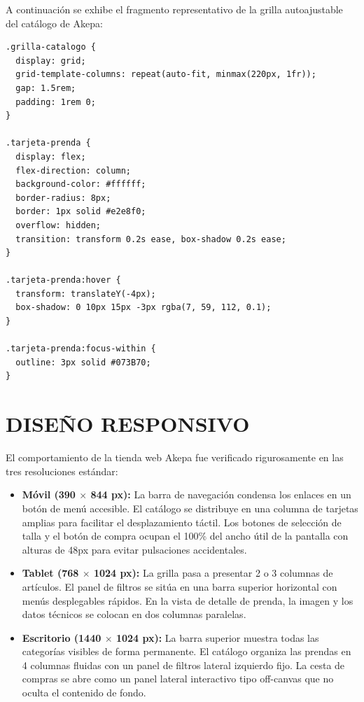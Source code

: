 \documentclass[12pt]{article}
\begin{document}
A continuación se exhibe el fragmento representativo de la grilla autoajustable del catálogo de Akepa:

\begin{lstlisting}
.grilla-catalogo {
  display: grid;
  grid-template-columns: repeat(auto-fit, minmax(220px, 1fr));
  gap: 1.5rem;
  padding: 1rem 0;
}

.tarjeta-prenda {
  display: flex;
  flex-direction: column;
  background-color: #ffffff;
  border-radius: 8px;
  border: 1px solid #e2e8f0;
  overflow: hidden;
  transition: transform 0.2s ease, box-shadow 0.2s ease;
}

.tarjeta-prenda:hover {
  transform: translateY(-4px);
  box-shadow: 0 10px 15px -3px rgba(7, 59, 112, 0.1);
}

.tarjeta-prenda:focus-within {
  outline: 3px solid #073B70;
}
\end{lstlisting}

\section*{DISEÑO RESPONSIVO}
El comportamiento de la tienda web Akepa fue verificado rigurosamente en las tres resoluciones estándar:

\begin{itemize}
    \item \textbf{Móvil (390 $\times$ 844 px):} La barra de navegación condensa los enlaces en un botón de menú accesible. El catálogo se distribuye en una columna de tarjetas amplias para facilitar el desplazamiento táctil. Los botones de selección de talla y el botón de compra ocupan el 100\% del ancho útil de la pantalla con alturas de 48px para evitar pulsaciones accidentales.
    \item \textbf{Tablet (768 $\times$ 1024 px):} La grilla pasa a presentar 2 o 3 columnas de artículos. El panel de filtros se sitúa en una barra superior horizontal con menús desplegables rápidos. En la vista de detalle de prenda, la imagen y los datos técnicos se colocan en dos columnas paralelas.
    \item \textbf{Escritorio (1440 $\times$ 1024 px):} La barra superior muestra todas las categorías visibles de forma permanente. El catálogo organiza las prendas en 4 columnas fluidas con un panel de filtros lateral izquierdo fijo. La cesta de compras se abre como un panel lateral interactivo tipo off-canvas que no oculta el contenido de fondo.
\end{itemize}
\end{document}
